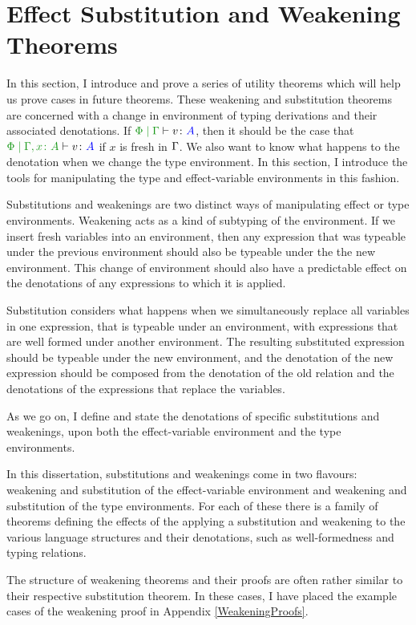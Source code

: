 \documentclass{Report}
\begin{document}
\section{Effect Substitution and Weakening Theorems}\label{SubsAndWeakening}


In this section, I introduce and prove a series of utility theorems which will help us prove cases in future theorems. These weakening and substitution theorems are concerned with a change in environment of typing derivations and their associated denotations. If $\gpetyperelation{v}{A}$, then it should be the case that $\etyperelation{\P}{\gax}{v}{A}$ if $x$ is fresh in $\Gamma$. We also want to know what happens to the denotation when we change the type environment. In this section, I introduce the tools for manipulating the type and effect-variable environments in this fashion.

Substitutions and weakenings are two distinct ways of manipulating effect or type environments. Weakening acts as a kind of subtyping of the environment. If we insert fresh variables into an environment, then any expression that was typeable under the previous environment should also be typeable under the the new environment. This change of environment should also have a predictable effect on the denotations of any expressions to which it is applied.

Substitution considers what happens when we simultaneously replace all variables in one expression, that is typeable under an environment, with expressions that are well formed under another environment. The resulting substituted expression should be typeable under the new environment, and the denotation of the new expression should be composed from the denotation of the old relation and the denotations of the expressions that replace the variables. 

As we go on, I define and state the denotations of specific substitutions and weakenings, upon both the effect-variable environment and the type environments.

In this dissertation, substitutions and weakenings come in two flavours: weakening and substitution of the effect-variable environment and weakening and substitution of the type environments. For each of these there is a family of theorems defining the effects of the applying a substitution and weakening to the various language structures and their denotations, such as well-formedness and typing relations.

\begin{framed}
    \begin{aside}
        The structure of weakening theorems and their proofs are often rather similar to their respective substitution theorem. In these cases, I have placed the example cases of the weakening proof in Appendix \ref{WeakeningProofs}.
    \end{aside}
\end{framed}
\end{document}
